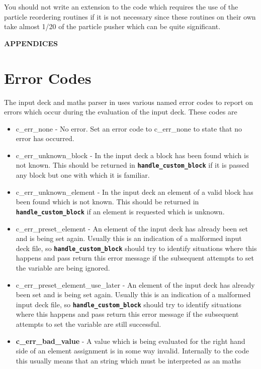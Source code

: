 \documentclass[12pt,a4paper]{article}
\newcommand{\inlinecode}[1]{{\color{warwickred} \bf\texttt{#1}}}
\newcommand{\EPOCH}{{\color{warwickdark}\fontfamily{phv}\selectfont{EPOCH}}}
\begin{document}
You should not write an extension to the code which requires the use of the
particle reordering routines if it is not necessary since these routines on
their own take almost 1/20 of the particle pusher which can be quite
significant.

\pagebreak

\appendix
  \begin{center}
    {\bf APPENDICES}
  \end{center}
\section{Error Codes}
The input deck and maths parser in {\EPOCH} uses various named error codes to
report on errors which occur during the evaluation of the input deck. These
codes are
\begin{itemize}
\item c\_err\_none - No error. Set an error code to c\_err\_none to state that no
  error has occurred.
\item c\_err\_unknown\_block - In the input deck a block has been found which is
  not known. This should be returned in \inlinecode{handle\_custom\_block} if it is
  passed any block but one with which it is familiar.
\item c\_err\_unknown\_element - In the input deck an element of a valid block has
  been found which is not known. This should be returned in
  \inlinecode{handle\_custom\_block} if an element is requested which is unknown.
\item c\_err\_preset\_element - An element of the input deck has already been set
  and is being set again. Usually this is an indication of a malformed input
  deck file, so \inlinecode{handle\_custom\_block} should try to identify
  situations where this happens and pass return this error message if the
  subsequent attempts to set the variable are being ignored.
\item c\_err\_preset\_element\_use\_later - An element of the input deck has
  already been set and is being set again. Usually this is an indication of a
  malformed input deck file, so \inlinecode{handle\_custom\_block} should try to
  identify situations where this happens and pass return this error message if
  the subsequent attempts to set the variable are still successful.
\item {\bf c\_err\_bad\_value} - A value which is being evaluated for the right
  hand side of an element assignment is in some way invalid. Internally to the
  code this usually means that an string which must be interpreted as an maths

\end{itemize}
\end{document}
